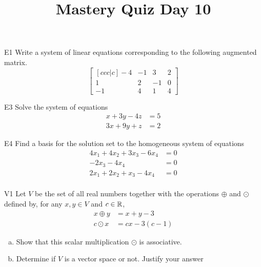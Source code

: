 \documentclass{sbgLAquiz}
\title{Mastery Quiz Day 10 }
\begin{document}
\begin{problem}{E1}
Write a system of linear equations corresponding to the following
augmented matrix.
\[
\begin{bmatrix}[ccc|c]
-4 & -1 & 3 & 2  \\
1 & 2 & -1 & 0 \\
-1 & 4 & 1 & 4
\end{bmatrix}
\]
\end{problem}

\begin{problem}{E3}
Solve the system of equations
\begin{align*}
x+3y-4z &= 5 \\
3x+9y+z &= 2
\end{align*}
\end{problem}
\newpage

\begin{problem}{E4}
Find a basis for the solution set to the homogeneous system of equations
\begin{align*}
4x_1+4x_2+3x_3-6x_4 &= 0 \\
-2x_3-4x_4 &= 0 \\
2x_1+2x_2+x_3-4x_4 &= 0 \\
\end{align*}
\end{problem}

\begin{problem}{V1}
Let $V$ be the  set of all real numbers together with the operations $\oplus$ and $\odot$ defined by, for any $x,y \in V$ and $c \in \mathbb{R}$,
\begin{align*}
x\oplus y  &= x+y-3 \\
c \odot x &= cx-3(c-1)
\end{align*}
\begin{enumerate}[(a)]
\item Show that this scalar multiplication $\odot$ is associative.
\item Determine if $V$ is a vector space or not.  Justify your answer
\end{enumerate}
\end{problem}
\end{document}
